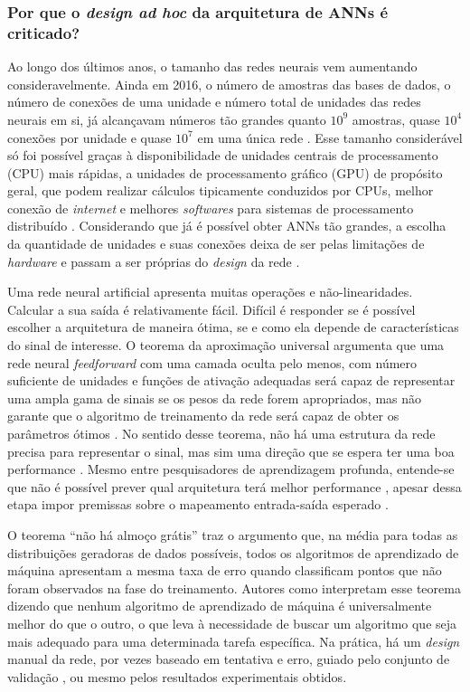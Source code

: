 \subsubsection{Por que o \textit{design ad hoc} da arquitetura de ANNs é criticado?}\label{sec:vapnik2}

Ao longo dos últimos anos, o tamanho das redes neurais vem aumentando consideravelmente. Ainda em 2016, o número de amostras das bases de dados, o número de conexões de uma unidade e número total de unidades das redes neurais em si, já alcançavam números tão grandes quanto $10^9$ amostras, quase $10^4$ conexões por unidade e quase $10^7$ em uma única rede \cite[Figuras 1.8 e 1.10 e 1.11]{goodfellow2016deep}. Esse tamanho considerável só foi possível graças à disponibilidade de unidades centrais de processamento (CPU) mais rápidas, a unidades de processamento gráfico (GPU) de propósito geral, que podem realizar cálculos tipicamente conduzidos por CPUs, melhor conexão de \textit{internet} e melhores \textit{softwares} para sistemas de processamento distribuído \cite[pág. 20]{goodfellow2016deep}. Considerando que já é possível obter ANNs tão grandes, a escolha da quantidade de unidades e suas conexões deixa de ser pelas limitações de \textit{hardware} e passam a ser próprias do \textit{design} da rede \cite[pág. 24]{goodfellow2016deep}. 

Uma rede neural artificial apresenta muitas operações e não-linearidades. Calcular a sua saída é relativamente fácil. Difícil é responder se é possível escolher a arquitetura de maneira ótima, se e como ela depende de características do sinal de interesse. O teorema da aproximação universal argumenta que uma rede neural \textit{feedforward} com uma camada oculta pelo menos, com número suficiente de unidades e funções de ativação adequadas será capaz de representar uma ampla gama de sinais se os pesos da rede forem apropriados, mas não garante que o algoritmo de treinamento da rede será capaz de obter os parâmetros ótimos \cite[pág. 198]{goodfellow2016deep}. No sentido desse teorema, não há uma estrutura da rede precisa para representar o sinal, mas sim uma direção que se espera ter uma boa performance \cite[pág. 170]{goodfellow2016deep}. Mesmo entre pesquisadores de aprendizagem profunda, entende-se que não é possível prever qual arquitetura terá melhor performance \cite[pág. 192]{goodfellow2016deep}, apesar dessa etapa impor premissas sobre o mapeamento entrada-saída esperado \cite{2017kukacka}. 

O teorema ``não há almoço grátis'' traz o argumento que, na média para todas as distribuições geradoras de dados possíveis, todos os algoritmos de aprendizado de máquina apresentam a mesma taxa de erro quando classificam pontos que não foram observados na fase do treinamento. Autores como \cite[pág. 120]{goodfellow2016deep} interpretam esse teorema dizendo que nenhum algoritmo de aprendizado de máquina é universalmente melhor do que o outro, o que leva à necessidade de buscar um algoritmo que seja mais adequado para uma determinada tarefa específica. Na prática, há um \textit{design} manual da rede, por vezes baseado em tentativa e erro, guiado pelo conjunto de validação \cite[pág. 198, 295]{goodfellow2016deep}, ou mesmo pelos resultados experimentais obtidos.

